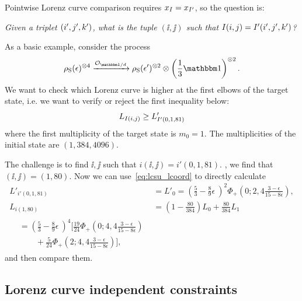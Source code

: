 Pointwise Lorenz curve comparison requires $x_{I} = x_{I'}$, so the question is: 
\begin{center}
\emph{Given a triplet $(i',j',k')$, what is the tuple $(\ii,\jj)$ such that $I(i,j) = I'(i',j',k')$?}
\end{center}

As a basic example, consider the process 
\begin{equation}
\rho_{\rm{S}}(\epsilon)\too{4} \xrightarrow{\mathcal{O}_{\id/d}} \rho_{\rm{S}}(\epsilon')\too{2} \otimes \left( \frac{1}{3}\id \right)\too{2}.
\end{equation}
We want to check which Lorenz curve is higher at the first elbows of the target state, i.e. we want to verify or reject the first inequality below:
\begin{equation}
	L_{I(i,j)} \geq L'_{I'(0, 1, 81)}
\end{equation}
where the first multiplicity of the target state is $m_0 = 1$.
The multiplicities of the initial state are $(1, 384, 4096)$.

The challenge is to find $\ii,\jj$ such that $i(\ii,\jj) = i'(0,1,81)$.
, we find that $(\ii,\jj) = (1, 80)$.
Now we can use~\cref{eq:lcsu_lcoord} to directly calculate
\begin{align*}
	L'_{i'(0,1,81)} &= L'_0 = \left( \frac{5}{3} - \frac{8}{9}\epsilon\ \right)^2 \Phi_+\left(0;2,4\frac{3-\epsilon}{15-8\epsilon}\right), \\
	L_{i(1, 80)} &= \left(1-\frac{80}{384} \right) L_0 + \frac{80}{384} L_1 \\
	\begin{split}
	&= \left( \frac{5}{3} - \frac{8}{9}\epsilon\ \right)^4 \bigg[ \frac{19}{24} \Phi_+\left(0;4,4\frac{3-\epsilon}{15-8\epsilon}\right) \\ 
	&\qquad + \frac{5}{24}\Phi_+\left(2;4,4\frac{3-\epsilon}{15-8\epsilon}\right) \bigg],
	\end{split}
\end{align*}
and then compare them.

\subsection{Lorenz curve independent constraints}\label{app:lc_constraints}

